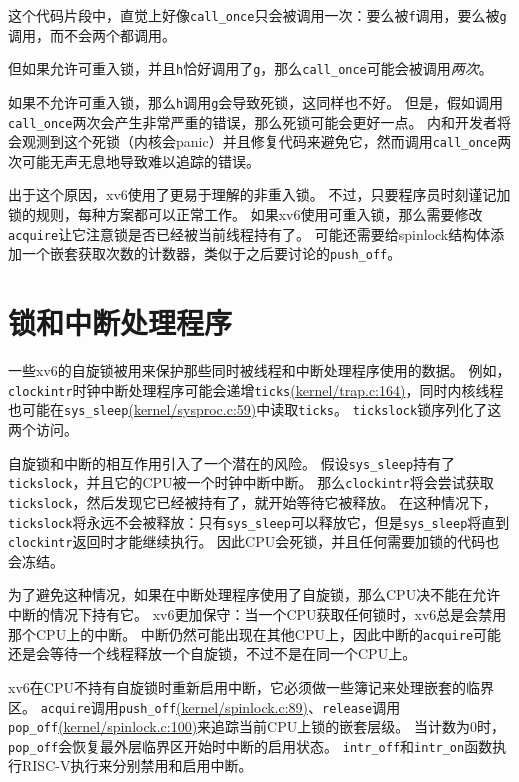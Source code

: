 这个代码片段中，直觉上好像\texttt{call\_once}只会被调用一次：要么被\texttt{f}调用，要么被\texttt{g}调用，而不会两个都调用。

但如果允许可重入锁，并且\texttt{h}恰好调用了\texttt{g}，那么\texttt{call\_once}可能会被调用\emph{两次}。

如果不允许可重入锁，那么\texttt{h}调用\texttt{g}会导致死锁，这同样也不好。
但是，假如调用\texttt{call\_once}两次会产生非常严重的错误，那么死锁可能会更好一点。
内和开发者将会观测到这个死锁（内核会panic）并且修复代码来避免它，然而调用\texttt{call\_once}两次可能无声无息地导致难以追踪的错误。

出于这个原因，xv6使用了更易于理解的非重入锁。
不过，只要程序员时刻谨记加锁的规则，每种方案都可以正常工作。
如果xv6使用可重入锁，那么需要修改\texttt{acquire}让它注意锁是否已经被当前线程持有了。
可能还需要给spinlock结构体添加一个嵌套获取次数的计数器，类似于之后要讨论的\texttt{push\_off}。

\section{锁和中断处理程序}\label{s6-6}
一些xv6的自旋锁被用来保护那些同时被线程和中断处理程序使用的数据。
例如，\texttt{clockintr}时钟中断处理程序可能会递增\texttt{ticks}\href{https://github.com/mit-pdos/xv6-riscv/blob/risc/kernel/trap.c#L164}{(kernel/trap.c:164)}，同时内核线程也可能在\texttt{sys\_sleep}\href{https://github.com/mit-pdos/xv6-riscv/blob/risc/kernel/sysproc.c#L59}{(kernel/sysproc.c:59)}中读取\texttt{ticks}。
\texttt{tickslock}锁序列化了这两个访问。

自旋锁和中断的相互作用引入了一个潜在的风险。
假设\texttt{sys\_sleep}持有了\texttt{tickslock}，并且它的CPU被一个时钟中断中断。
那么\texttt{clockintr}将会尝试获取\texttt{tickslock}，然后发现它已经被持有了，就开始等待它被释放。
在这种情况下，\texttt{tickslock}将永远不会被释放：只有\texttt{sys\_sleep}可以释放它，但是\texttt{sys\_sleep}将直到\texttt{clockintr}返回时才能继续执行。
因此CPU会死锁，并且任何需要加锁的代码也会冻结。

为了避免这种情况，如果在中断处理程序使用了自旋锁，那么CPU决不能在允许中断的情况下持有它。
xv6更加保守：当一个CPU获取任何锁时，xv6总是会禁用那个CPU上的中断。
中断仍然可能出现在其他CPU上，因此中断的\texttt{acquire}可能还是会等待一个线程释放一个自旋锁，不过不是在同一个CPU上。

xv6在CPU不持有自旋锁时重新启用中断，它必须做一些簿记来处理嵌套的临界区。
\texttt{acquire}调用\texttt{push\_off}\href{https://github.com/mit-pdos/xv6-riscv/blob/risc/kernel/spinlock.c#L89}{(kernel/spinlock.c:89)}、\texttt{release}调用\texttt{pop\_off}\href{https://github.com/mit-pdos/xv6-riscv/blob/risc/kernel/spinlock.c#L100}{(kernel/spinlock.c:100)}来追踪当前CPU上锁的嵌套层级。
当计数为0时，\texttt{pop\_off}会恢复最外层临界区开始时中断的启用状态。
\texttt{intr\_off}和\texttt{intr\_on}函数执行RISC-V执行来分别禁用和启用中断。

